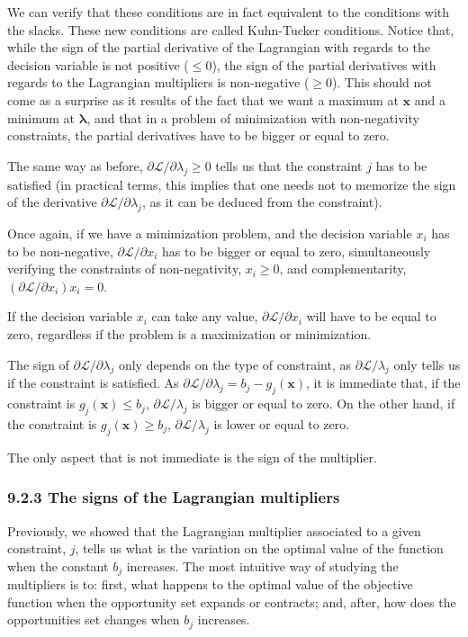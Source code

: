 \documentclass[0pt, a4paper]{article}
\newcommand{\Lagr}{\mathcal{L}}
\begin{document}
We can verify that these conditions are in fact equivalent to the conditions with the slacks. These new conditions are called Kuhn-Tucker conditions. Notice that, while the sign of the partial derivative of the Lagrangian with regards to the decision variable is not positive ($\leq0$), the sign of the partial derivatives with regards to the Lagrangian multipliers is non-negative ($\geq0$). This should not come as a surprise as it results of the fact that we want a maximum at $\textbf{x}$ and a minimum at $\boldsymbol{\lambda}$, and that in a problem of minimization with non-negativity constraints, the partial derivatives have to be bigger or equal to zero.

The same way as before, $\partial\Lagr/\partial\lambda_j\geq0$ tells us that the constraint $j$ has to be satisfied (in practical terms, this implies that one needs not to memorize the sign of the derivative $\partial\Lagr/\partial\lambda_j$, as it can be deduced from the constraint).

Once again, if we have a minimization problem, and the decision variable $x_i$ has to be non-negative, $\partial\Lagr/\partial x_i$ has to be bigger or equal to zero, simultaneously verifying the constraints of non-negativity, $x_i\geq0$, and complementarity, $(\partial\Lagr/\partial x_i)x_i=0$.

If the decision variable $x_i$ can take any value, $\partial\Lagr/\partial x_i$ will have to be equal to zero, regardless if the problem is a maximization or minimization.

The sign of $\partial\Lagr/\partial\lambda_j$ only depends on the type of constraint, as $\partial\Lagr/\lambda_j$ only tells us if the constraint is satisfied. As $\partial\Lagr/\partial\lambda_j=b_j-g_j(\textbf{x})$, it is immediate that, if the constraint is $g_j(\textbf{x})\leq b_j$,  $\partial\Lagr/\lambda_j$ is bigger or equal to zero. On the other hand, if the constraint is $g_j(\textbf{x})\geq b_j$,  $\partial\Lagr/\lambda_j$ is lower or equal to zero.

The only aspect that is not immediate is the sign of the multiplier.

\subsubsection*{9.2.3 The signs of the Lagrangian multipliers}

Previously, we showed that the Lagrangian multiplier associated to a given constraint, $j$, tells us what is the variation on the optimal value of the function when the constant $b_j$ increases. The most intuitive way of studying the multipliers is to: first, what happens to the optimal value of the objective function when the opportunity set expands or contracts; and, after, how does the opportunities set changes when $b_j$ increases.
\end{document}
